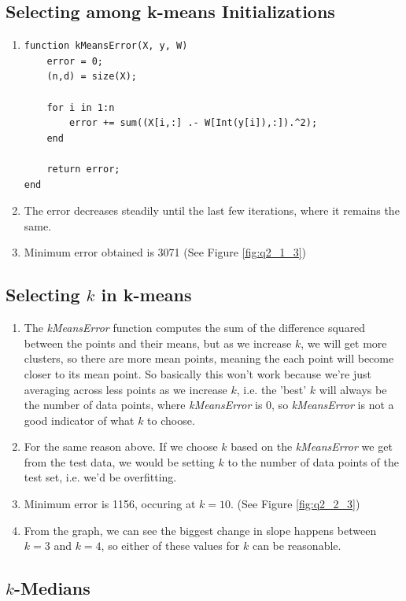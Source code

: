 \documentclass{article}
\def\enum#1{\begin{enumerate}#1\end{enumerate}}
\begin{document}
\subsection{Selecting among k-means Initializations}
 
\begin{enumerate}
 \item
\begin{verbatim}
function kMeansError(X, y, W)
    error = 0;
    (n,d) = size(X);

    for i in 1:n
        error += sum((X[i,:] .- W[Int(y[i]),:]).^2);
    end

    return error;
end
\end{verbatim}

 \item The error decreases steadily until the last few iterations, where it remains the same.
 \item Minimum error obtained is 3071 (See Figure \ref{fig:q2_1_3})
\end{enumerate}
 
 \subsection{Selecting $k$ in k-means}
  
 \enum{
 \item The \emph{kMeansError} function computes the sum of the difference squared between the points and their means, but as we increase $k$, we will get more clusters, so there are more mean points, meaning the each point will become closer to its mean point. So basically this won't work because we're just averaging across less points as we increase $k$, i.e. the 'best' $k$ will always be the number of data points, where \emph{kMeansError} is 0, so \emph{kMeansError} is not a good indicator of what $k$ to choose.
 \item For the same reason above. If we choose $k$ based on the \emph{kMeansError} we get from the test data, we would be setting $k$ to the number of data points of the test set, i.e. we'd be overfitting.
 \item Minimum error is 1156, occuring at $k = 10$. (See Figure \ref{fig:q2_2_3})
 \item From the graph, we can see the biggest change in slope happens between $k=3$ and $k=4$, so either of these values for $k$ can be reasonable. 
 }
 
 \subsection{$k$-Medians}
 
\end{document}
